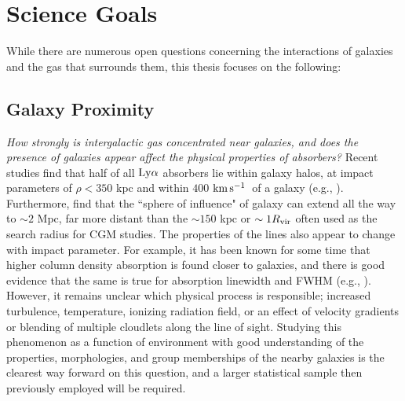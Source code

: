 \documentclass[twocolumn,tighten]{aastex62}
\newcommand{\kms}{$\rm km\, s^{-1}$}
\begin{document}
\section{Science Goals}
While there are numerous open questions concerning the interactions of galaxies and the gas that surrounds them, this thesis focuses on the following:


\subsection{Galaxy Proximity}
\emph{How strongly is intergalactic gas concentrated near galaxies, and does the presence of galaxies appear affect the physical properties of absorbers?} Recent studies find that half of all $\rm Ly\alpha$ absorbers lie within galaxy halos, at impact parameters of $\rho <350$ kpc and within $400$ \kms~of a galaxy (e.g., \citealt{cote2005, prochaska2006, wakker2009}). Furthermore, \cite{sorini2018} find that the ``sphere of influence" of galaxy can extend all the way to $\sim 2$ Mpc, far more distant than the $\sim150$ kpc or $\sim 1 R_{\rm vir}$ often used as the search radius for CGM studies. The properties of the lines also appear to change with impact parameter. For example, it has been known for some time that higher column density absorption is found closer to galaxies, and there is good evidence that the same is true for absorption linewidth and FWHM (e.g., \citealt{wakker2009, prochaska2011}). However, it remains unclear which physical process is responsible; increased turbulence, temperature, ionizing radiation field, or an effect of velocity gradients or blending of multiple cloudlets along the line of sight. Studying this phenomenon as a function of environment with good understanding of the properties, morphologies, and group memberships of the nearby galaxies is the clearest way forward on this question, and a larger statistical sample then previously employed will be required.
\end{document}
